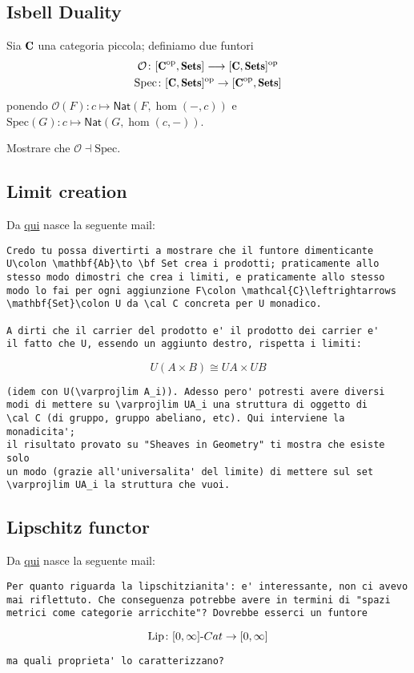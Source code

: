 \subsection*{Isbell Duality}
Sia $\C$ una categoria piccola; definiamo due funtori
\begin{gather*}
\mathcal O \colon [\C^\text{op}, \Sets]\longrightarrow [\C, \Sets]^\text{op}\\
\text{Spec}\colon [\C, \Sets]^\text{op} \to [\C^\text{op}, \Sets]
\end{gather*}
ponendo $\mathcal O(F)\colon c\mapsto \mathsf{Nat}(F, \hom(-,c))$ e $\text{Spec}(G)\colon c\mapsto \mathsf{Nat}(G, \hom(c,-))$.

Mostrare che $\mathcal O\dashv \text{Spec}$.


\subsection*{Limit creation}

Da \hyperlink{limit-creation}{qui} nasce la seguente mail:
\begin{verbatim}
Credo tu possa divertirti a mostrare che il funtore dimenticante 
U\colon \mathbf{Ab}\to \bf Set crea i prodotti; praticamente allo 
stesso modo dimostri che crea i limiti, e praticamente allo stesso 
modo lo fai per ogni aggiunzione F\colon \mathcal{C}\leftrightarrows
\mathbf{Set}\colon U da \cal C concreta per U monadico.

A dirti che il carrier del prodotto e' il prodotto dei carrier e' 
il fatto che U, essendo un aggiunto destro, rispetta i limiti:
\end{verbatim}
\[
U(A\times B)\cong UA\times UB
\]
\begin{verbatim}
(idem con U(\varprojlim A_i)). Adesso pero' potresti avere diversi 
modi di mettere su \varprojlim UA_i una struttura di oggetto di 
\cal C (di gruppo, gruppo abeliano, etc). Qui interviene la monadicita'; 
il risultato provato su "Sheaves in Geometry" ti mostra che esiste solo 
un modo (grazie all'universalita' del limite) di mettere sul set 
\varprojlim UA_i la struttura che vuoi.
\end{verbatim}




\subsection*{Lipschitz functor}

Da \hyperlink{lipschitz-functor}{qui} nasce la seguente mail:
\begin{verbatim}
Per quanto riguarda la lipschitzianita': e' interessante, non ci avevo 
mai riflettuto. Che conseguenza potrebbe avere in termini di "spazi 
metrici come categorie arricchite"? Dovrebbe esserci un funtore
\end{verbatim}
\[
\text{Lip}\colon [0,\infty]\text{-}{\bf Cat}\to [0,\infty]
\]
\begin{verbatim}
ma quali proprieta' lo caratterizzano?
\end{verbatim}




